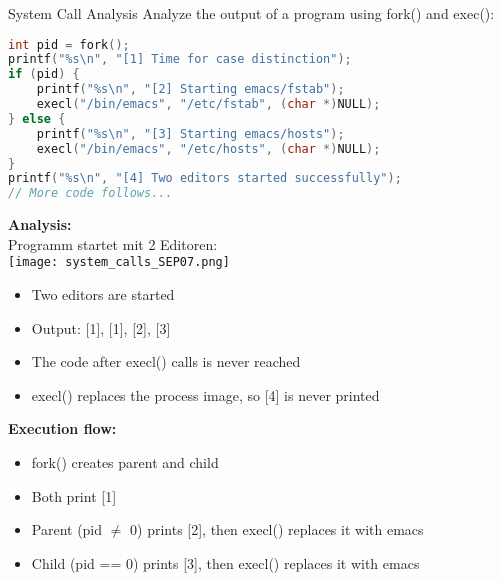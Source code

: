 \begin{example2}{System Call Analysis}
    Analyze the output of a program using fork() and exec():
    
\begin{lstlisting}[language=C, style=basesmol]
int pid = fork();
printf("%s\n", "[1] Time for case distinction");
if (pid) {
    printf("%s\n", "[2] Starting emacs/fstab");
    execl("/bin/emacs", "/etc/fstab", (char *)NULL);
} else {
    printf("%s\n", "[3] Starting emacs/hosts");
    execl("/bin/emacs", "/etc/hosts", (char *)NULL);
}
printf("%s\n", "[4] Two editors started successfully");
// More code follows...
\end{lstlisting}
    
    \tcblower
    
    \textbf{Analysis:}\\
    Programm startet mit 2 Editoren:\\
    \texttt{[image: system\_calls\_SEP07.png]}

    \begin{itemize}
        \item Two editors are started
        \item Output: [1], [1], [2], [3]
        \item The code after execl() calls is never reached
        \item execl() replaces the process image, so [4] is never printed
    \end{itemize}
    
    \textbf{Execution flow:}
    \begin{itemize}
        \item fork() creates parent and child
        \item Both print [1]
        \item Parent (pid $\neq$ 0) prints [2], then execl() replaces it with emacs
        \item Child (pid == 0) prints [3], then execl() replaces it with emacs
    \end{itemize}
\end{example2}

